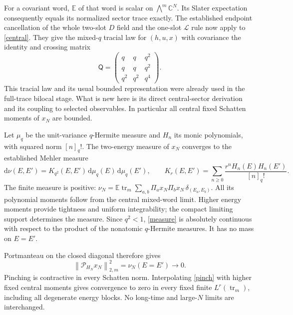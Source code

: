 \documentclass[11pt]{article}
\newcommand{\E}{\mathbb E}
\newcommand{\tr}{\operatorname{tr}}
\newcommand{\norm}[1]{\left\lVert#1\right\rVert}
\newcommand{\dd}{\mathrm d}
\begin{document}
For a covariant word, $\E$ of that word is scalar on
$\bigwedge^m\mathbb C^N$. Its Slater expectation consequently equals
its normalized sector trace exactly. The established endpoint
cancellation of the whole two-slot $D$ field and the one-slot
$\mathcal L$ rule now apply to \eqref{central}. They give the mixed-$q$
tracial law for $(h,u,x)$ with covariance the identity and crossing matrix
\begin{equation}\label{mixedq}
 \mathsf Q=\begin{pmatrix}
 q&q&q^2\\q&q&q^2\\q^2&q^2&q^4
 \end{pmatrix}.
\end{equation}
This tracial law and its usual bounded representation were already
used in the full-trace bilocal stage. What is new here is its direct
central-sector derivation and its coupling to selected observables.
In particular all central fixed Schatten moments of $x_N$ are bounded.

Let $\mu_q$ be the unit-variance $q$-Hermite measure and $H_n$ its
monic polynomials, with squared norm $[n]_q!$. The two-energy measure
of $x_N$ converges to the established Mehler measure
\begin{equation}\label{measure}
 \dd\nu(E,E')=K_{q^2}(E,E')\,\dd\mu_q(E)\,\dd\mu_q(E'),\qquad
 K_r(E,E')=\sum_{n\ge0}\frac{r^nH_n(E)H_n(E')}{[n]_q!}.
\end{equation}
The finite measure is positive:
$\nu_N=\E\tr_m\sum_{a,b}\Pi_a x_N\Pi_bx_N\,
\delta_{(E_a,E_b)}$. All its polynomial moments follow from the
central mixed-word limit. Higher energy moments provide tightness
and uniform integrability; the compact limiting support determines
the measure. Since $q^2<1$, \eqref{measure} is absolutely continuous
with respect to the product of the nonatomic $q$-Hermite measures.
It has no mass on $E=E'$.

Portmanteau on the closed diagonal therefore gives
\begin{equation}\label{pinch}
 \norm{\mathcal P_{H_N}x_N}_{2,m}^2=\nu_N(E=E')\longrightarrow0.
\end{equation}
Pinching is contractive in every Schatten norm. Interpolating
\eqref{pinch} with higher fixed central moments gives convergence
to zero in every fixed finite $L^r(\tr_m)$, including all degenerate
energy blocks. No long-time and large-$N$ limits are interchanged.

\newpage
\end{document}
